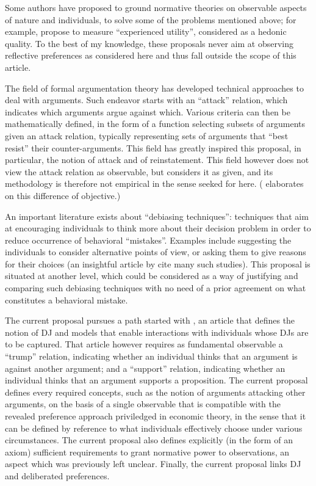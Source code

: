 \documentclass[version=last, pagesize, twoside=off, bibliography=totoc, DIV=calc, fontsize=12pt, a4paper, french, english]{scrartcl}
\begin{document}
Some authors have proposed to ground normative theories on observable aspects of nature and individuals, to solve some of the problems mentioned above; for example, \citet{kahneman_back_1997} propose to measure “experienced utility”, considered as a hedonic quality. To the best of my knowledge, these proposals never aim at observing reflective preferences as considered here and thus fall outside the scope of this article.

The field of formal argumentation theory has developed technical approaches to deal with arguments. Such endeavor starts with an “attack” relation, which indicates which arguments argue against which. Various criteria can then be mathematically defined, in the form of a function selecting subsets of arguments given an attack relation, typically representing sets of arguments that “best resist” their counter-arguments. This field has greatly inspired this proposal, in particular, the notion of attack and of reinstatement. This field however does not view the attack relation as observable, but considers it as given, and its methodology is therefore not empirical in the sense seeked for here. ( elaborates on this difference of objective.)

An important literature exists about “debiasing techniques”: techniques that aim at encouraging individuals to think more about their decision problem in order to reduce occurrence of behavioral “mistakes”. Examples include suggesting the individuals to consider alternative points of view, or asking them to give reasons for their choices (an insightful article by \citet{mitchell_libertarian_2004} cite many such studies). This proposal is situated at another level, which could be considered as a way of justifying and comparing such debiasing techniques with no need of a prior agreement on what constitutes a behavioral mistake.

The current proposal pursues a path started with \citet{cailloux_formal_2019}, an article that defines the notion of \ac{DJ} and models that enable interactions with individuals whose \acp{DJ} are to be captured. That article however requires as fundamental observable a “trump” relation, indicating whether an individual thinks that an argument is against another argument; and a “support” relation, indicating whether an individual thinks that an argument supports a proposition. The current proposal defines every required concepts, such as the notion of arguments attacking other arguments, on the basis of a single observable that is compatible with the revealed preference approach priviledged in economic theory, in the sense that it can be defined by reference to what individuals effectively choose under various circumstances. The current proposal also defines explicitly (in the form of an axiom) sufficient requirements to grant normative power to observations, an aspect which was previously left unclear. Finally, the current proposal links \ac{DJ} and deliberated preferences. 
\end{document}
